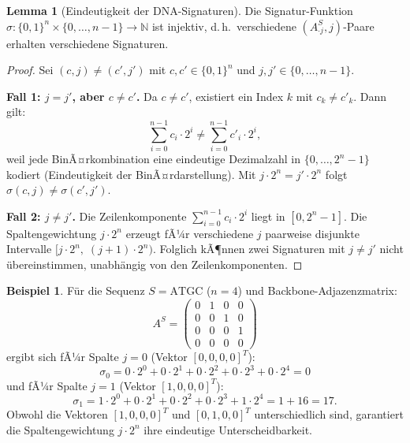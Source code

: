 ﻿\documentclass[a4paper,12pt]{article}
\theoremstyle{definition}
\newtheorem{beispiel}{Beispiel}
\newtheorem{lemma}{Lemma}
\begin{document}
\begin{lemma}[Eindeutigkeit der DNA-Signaturen]
    \label{lem:eindeutigkeit}
    Die Signatur-Funktion $\sigma: \{0,1\}^n \times \{0,\ldots,n-1\} \to \mathbb{N}$
    ist injektiv, d.\,h.\  verschiedene $(A^S_{\cdot j}, j)$-Paare erhalten
    verschiedene Signaturen.
\end{lemma}

\begin{proof}
    Sei $(c, j) \neq (c', j')$ mit $c, c' \in \{0,1\}^n$ und
    $j, j' \in \{0, \ldots, n-1\}$.

    \textbf{Fall 1: $j = j'$, aber $c \neq c'$.}
    Da $c \neq c'$, existiert ein Index $k$ mit $c_k \neq c'_k$.
    Dann gilt:
    \[
        \sum_{i=0}^{n-1} c_i \cdot 2^i \neq \sum_{i=0}^{n-1} c'_i \cdot 2^i,
    \]
    weil jede BinÃ¤rkombination eine eindeutige Dezimalzahl in
    $\{0, \ldots, 2^n - 1\}$ kodiert (Eindeutigkeit der BinÃ¤rdarstellung).
    Mit $j \cdot 2^n = j' \cdot 2^n$ folgt $\sigma(c, j) \neq \sigma(c', j')$.

    \textbf{Fall 2: $j \neq j'$.}
    Die Zeilenkomponente $\sum_{i=0}^{n-1} c_i \cdot 2^i$ liegt in
    $[0, 2^n - 1]$. Die Spaltengewichtung $j \cdot 2^n$ erzeugt fÃ¼r verschiedene
    $j$ paarweise disjunkte Intervalle $[j \cdot 2^n,\; (j+1) \cdot 2^n)$.
    Folglich kÃ¶nnen zwei Signaturen mit $j \neq j'$ nicht \"{u}bereinstimmen,
    unabh\"{a}ngig von den Zeilenkomponenten. 
\end{proof}

\begin{beispiel}
    F\"{u}r die Sequenz $S = \text{ATGC}$ ($n = 4$) und Backbone-Adjazenzmatrix:
    \[
        A^S = \begin{pmatrix}
            0 & 1 & 0 & 0 \\
            0 & 0 & 1 & 0 \\
            0 & 0 & 0 & 1 \\
            0 & 0 & 0 & 0
        \end{pmatrix}
    \]
    ergibt sich fÃ¼r Spalte $j = 0$ (Vektor $[0,0,0,0]^T$):
    \[
        \sigma_0 = 0 \cdot 2^0 + 0 \cdot 2^1 + 0 \cdot 2^2 + 0 \cdot 2^3
                 + 0 \cdot 2^4 = 0
    \]
    und fÃ¼r Spalte $j = 1$ (Vektor $[1,0,0,0]^T$):
    \[
        \sigma_1 = 1 \cdot 2^0 + 0 \cdot 2^1 + 0 \cdot 2^2 + 0 \cdot 2^3
                 + 1 \cdot 2^4 = 1 + 16 = 17.
    \]
    Obwohl die Vektoren $[1,0,0,0]^T$ und $[0,1,0,0]^T$ unterschiedlich sind,
    garantiert die Spaltengewichtung $j \cdot 2^n$ ihre eindeutige Unterscheidbarkeit.
\end{beispiel}
\end{document}
